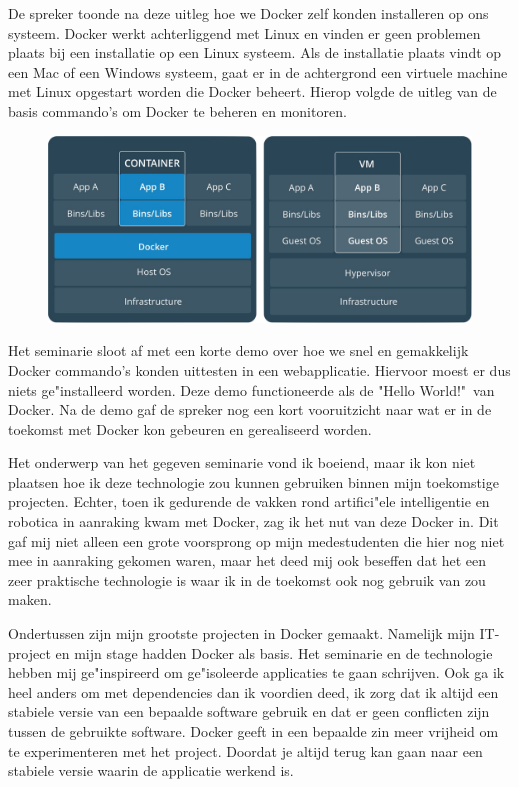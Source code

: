 De spreker toonde na deze uitleg hoe we Docker zelf konden installeren op ons systeem. Docker werkt achterliggend met Linux en vinden er geen problemen plaats bij een installatie op een Linux systeem. Als de installatie plaats vindt op een Mac of een Windows systeem, gaat er in de achtergrond een virtuele machine met Linux opgestart worden die Docker beheert. Hierop volgde de uitleg van de basis commando's om Docker te beheren en monitoren.

\begin{figure}[!h]
  \centering
  \includegraphics[width=0.72\linewidth]{images/docker/docker_vs_vm.png}
\end{figure}

Het seminarie sloot af met een korte demo over hoe we snel en gemakkelijk Docker commando's konden uittesten in een webapplicatie. Hiervoor moest er dus niets ge"installeerd worden. Deze demo functioneerde als de "Hello World!"\ van Docker. Na de demo gaf de spreker nog een kort vooruitzicht naar wat er in de toekomst met Docker kon gebeuren en gerealiseerd worden.

Het onderwerp van het gegeven seminarie vond ik boeiend, maar ik kon niet plaatsen hoe ik deze technologie zou kunnen gebruiken binnen mijn toekomstige projecten. Echter, toen ik gedurende de vakken rond artifici"ele intelligentie en robotica in aanraking kwam met Docker, zag ik het nut van deze Docker in. Dit gaf mij niet alleen een grote voorsprong op mijn medestudenten die hier nog niet mee in aanraking gekomen waren, maar het deed mij ook beseffen dat het een zeer praktische technologie is waar ik in de toekomst ook nog gebruik van zou maken.

Ondertussen zijn mijn grootste projecten in Docker gemaakt. Namelijk mijn IT\hyp{}project en mijn stage hadden Docker als basis. Het seminarie en de technologie hebben mij ge"inspireerd om ge"isoleerde applicaties te gaan schrijven. Ook ga ik heel anders om met dependencies dan ik voordien deed, ik zorg dat ik altijd een stabiele versie van een bepaalde software gebruik en dat er geen conflicten zijn tussen de gebruikte software. Docker geeft in een bepaalde zin meer vrijheid om te experimenteren met het project. Doordat je altijd terug kan gaan naar een stabiele versie waarin de applicatie werkend is.

